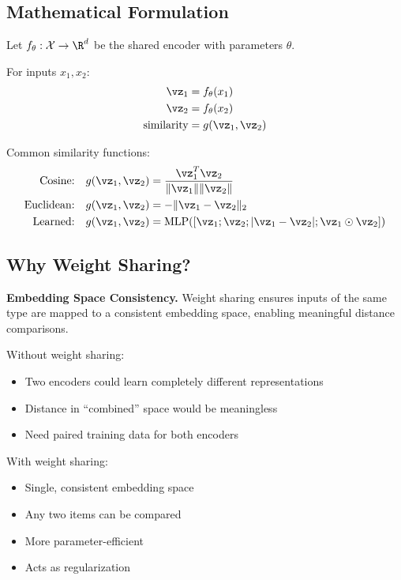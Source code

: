 \subsection{Mathematical Formulation}

Let $f_\theta: \mathcal{X} \to \R^d$ be the shared encoder with parameters $\theta$.

For inputs $x_1, x_2$:
\begin{align}
\vz_1 &= f_\theta(x_1) \\
\vz_2 &= f_\theta(x_2) \\
\text{similarity} &= g(\vz_1, \vz_2)
\end{align}

Common similarity functions:
\begin{align}
\text{Cosine:} \quad g(\vz_1, \vz_2) &= \frac{\vz_1^T \vz_2}{\|\vz_1\| \|\vz_2\|} \\
\text{Euclidean:} \quad g(\vz_1, \vz_2) &= -\|\vz_1 - \vz_2\|_2 \\
\text{Learned:} \quad g(\vz_1, \vz_2) &= \text{MLP}([\vz_1; \vz_2; |\vz_1 - \vz_2|; \vz_1 \odot \vz_2])
\end{align}

\subsection{Why Weight Sharing?}

\textbf{Embedding Space Consistency.} Weight sharing ensures inputs of the same type are mapped to a consistent embedding space, enabling meaningful distance comparisons.

Without weight sharing:
\begin{itemize}
    \item Two encoders could learn completely different representations
    \item Distance in ``combined'' space would be meaningless
    \item Need paired training data for both encoders
\end{itemize}

With weight sharing:
\begin{itemize}
    \item Single, consistent embedding space
    \item Any two items can be compared
    \item More parameter-efficient
    \item Acts as regularization
\end{itemize}

